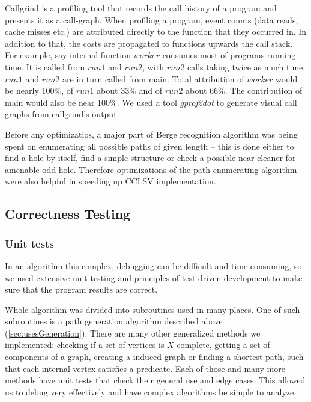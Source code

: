 Callgrind is a profiling tool that records the call history of a program and presents it as a call-graph. When profiling a program, event counts (data reads, cache misses etc.) are attributed directly to the function that they occurred in. In addition to that, the costs are propagated to functions upwards the call stack. For example, say internal function $worker$ consumes most of programs running time. It is called from $run1$ and $run2$, with $run2$ calls taking twice as much time. $run1$ and $run2$ are in turn called from main. Total attribution of $worker$ would be nearly 100\%, of $run1$ about 33\% and of $run2$ about 66\%. The contribution of main would also be near 100\%. We used a tool \emph{gprof2dot} \cite{gprof2dot} to generate visual call graphs from callgrind's output.



Before any optimizatios, a major part of Berge recognition algorithm was being spent on enumerating all possible paths of given length -- this is done either to find a hole by itself, find a simple structure or check a possible near cleaner for amenable odd hole. Therefore optimizations of the path enumerating algorithm were also helpful in speeding up CCLSV implementation.



\subsection{Correctness Testing}

\subsubsection{Unit tests}

In an algorithm this complex, debugging can be difficult and time consuming, so we used extensive unit testing and principles of test driven development to make sure that the program results are correct.

Whole algorithm was divided into subroutines used in many places. One of such subroutines is a path generation algorithm described above (\cref{sec:usesGeneration}). There are many other generalized methods we implemented: checking if a set of vertices is $X$-complete, getting a set of components of a graph, creating a induced graph or finding a shortest path, such that each internal vertex satisfies a predicate. Each of those and many more methods have unit tests that check their general use and edge cases. This allowed us to debug very effectively and have complex algorithms be simple to analyze.


